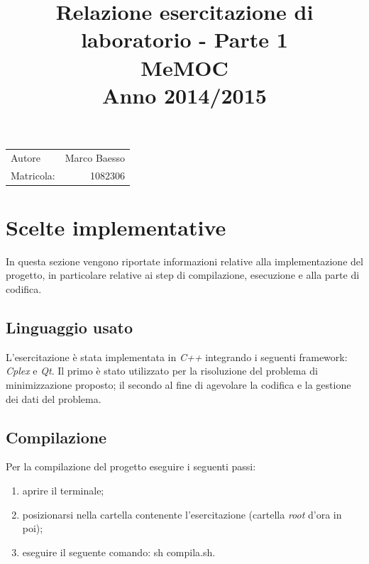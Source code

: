 \documentclass{article}
\title{Relazione esercitazione di laboratorio - Parte 1
\\ MeMOC
\\ Anno 2014/2015}
\date{} %
\author{} %
\begin{document}
\maketitle %

\begin{center}
\begin{tabular}{l r}
Autore & Marco Baesso \\ %
Matricola: & 1082306 \\ %
\end{tabular}
\end{center}



\section{Scelte implementative}
In questa sezione vengono riportate informazioni relative alla implementazione del progetto, in particolare relative ai step di compilazione, esecuzione e alla parte di codifica.

\subsection{Linguaggio usato}
\label{linguaggio}
L'esercitazione è stata implementata in \textit{C++} integrando i seguenti framework: \textit{Cplex} e \textit{Qt}. Il primo è stato utilizzato per la risoluzione del problema di minimizzazione proposto; il secondo al fine di agevolare la codifica e la gestione dei dati del problema.

\subsection{Compilazione}
\label{compilazione}
Per la compilazione del progetto eseguire i seguenti passi:
\begin{enumerate}[I]
\item aprire il terminale;
\item posizionarsi nella cartella contenente l'esercitazione (cartella \textit{root} d'ora in poi);
\item eseguire il seguente comando: sh compila.sh.
\end{enumerate}
\end{document}
